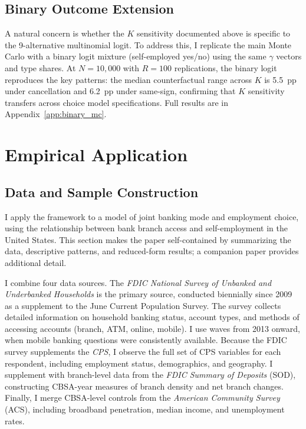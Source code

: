 \documentclass[12pt]{article}
\begin{document}
\subsection{Binary Outcome Extension}

A natural concern is whether the $K$ sensitivity documented above is specific to the 9-alternative multinomial logit. To address this, I replicate the main Monte Carlo with a binary logit mixture (self-employed yes/no) using the same $\gamma$ vectors and type shares. At $N = 10{,}000$ with $R = 100$ replications, the binary logit reproduces the key patterns: the median counterfactual range across $K$ is 5.5~pp under cancellation and 6.2~pp under same-sign, confirming that $K$ sensitivity transfers across choice model specifications. Full results are in Appendix~\ref{app:binary_mc}.


\section{Empirical Application}
\label{sec:application}

\subsection{Data and Sample Construction}
\label{subsec:data}

I apply the framework to a model of joint banking mode and employment choice, using the relationship between bank branch access and self-employment in the United States. This section makes the paper self-contained by summarizing the data, descriptive patterns, and reduced-form results; a companion paper \citep{malkova2026substantive} provides additional detail.

I combine four data sources. The \textit{FDIC National Survey of Unbanked and Underbanked Households} is the primary source, conducted biennially since 2009 as a supplement to the June Current Population Survey. The survey collects detailed information on household banking status, account types, and methods of accessing accounts (branch, ATM, online, mobile). I use waves from 2013 onward, when mobile banking questions were consistently available. Because the FDIC survey supplements the \textit{CPS}, I observe the full set of CPS variables for each respondent, including employment status, demographics, and geography. I supplement with branch-level data from the \textit{FDIC Summary of Deposits} (SOD), constructing CBSA-year measures of branch density and net branch changes. Finally, I merge CBSA-level controls from the \textit{American Community Survey} (ACS), including broadband penetration, median income, and unemployment rates.
\end{document}
